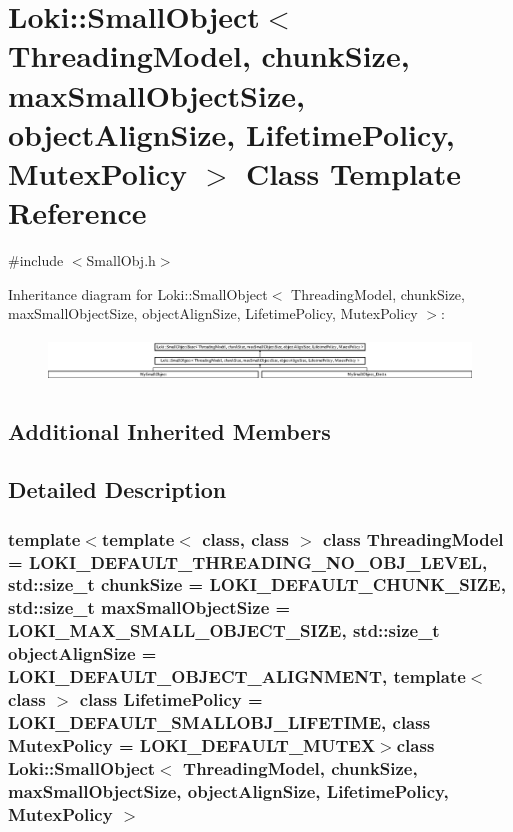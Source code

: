 \hypertarget{classLoki_1_1SmallObject}{}\section{Loki\+:\+:Small\+Object$<$ Threading\+Model, chunk\+Size, max\+Small\+Object\+Size, object\+Align\+Size, Lifetime\+Policy, Mutex\+Policy $>$ Class Template Reference}
\label{classLoki_1_1SmallObject}


{\ttfamily \#include $<$Small\+Obj.\+h$>$}

Inheritance diagram for Loki\+:\+:Small\+Object$<$ Threading\+Model, chunk\+Size, max\+Small\+Object\+Size, object\+Align\+Size, Lifetime\+Policy, Mutex\+Policy $>$\+:\begin{figure}[H]
\begin{center}
\leavevmode
\includegraphics[height=1.183099cm]{classLoki_1_1SmallObject}
\end{center}
\end{figure}
\subsection*{Additional Inherited Members}


\subsection{Detailed Description}
\subsubsection*{template$<$template$<$ class, class $>$ class Threading\+Model = L\+O\+K\+I\+\_\+\+D\+E\+F\+A\+U\+L\+T\+\_\+\+T\+H\+R\+E\+A\+D\+I\+N\+G\+\_\+\+N\+O\+\_\+\+O\+B\+J\+\_\+\+L\+E\+V\+E\+L, std\+::size\+\_\+t chunk\+Size = L\+O\+K\+I\+\_\+\+D\+E\+F\+A\+U\+L\+T\+\_\+\+C\+H\+U\+N\+K\+\_\+\+S\+I\+Z\+E, std\+::size\+\_\+t max\+Small\+Object\+Size = L\+O\+K\+I\+\_\+\+M\+A\+X\+\_\+\+S\+M\+A\+L\+L\+\_\+\+O\+B\+J\+E\+C\+T\+\_\+\+S\+I\+Z\+E, std\+::size\+\_\+t object\+Align\+Size = L\+O\+K\+I\+\_\+\+D\+E\+F\+A\+U\+L\+T\+\_\+\+O\+B\+J\+E\+C\+T\+\_\+\+A\+L\+I\+G\+N\+M\+E\+N\+T, template$<$ class $>$ class Lifetime\+Policy = L\+O\+K\+I\+\_\+\+D\+E\+F\+A\+U\+L\+T\+\_\+\+S\+M\+A\+L\+L\+O\+B\+J\+\_\+\+L\+I\+F\+E\+T\+I\+M\+E, class Mutex\+Policy = L\+O\+K\+I\+\_\+\+D\+E\+F\+A\+U\+L\+T\+\_\+\+M\+U\+T\+E\+X$>$class Loki\+::\+Small\+Object$<$ Threading\+Model, chunk\+Size, max\+Small\+Object\+Size, object\+Align\+Size, Lifetime\+Policy, Mutex\+Policy $>$}

